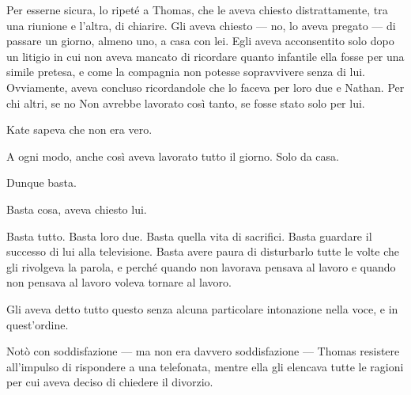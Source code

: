 \documentclass[a4paper,oneside,11pt]{memoir}
\begin{document}
Per esserne sicura, lo ripeté a Thomas, che le aveva chiesto distrattamente, tra una riunione e
l'altra, di chiarire. Gli aveva chiesto — no, lo aveva pregato — di passare un giorno, almeno uno, a
casa con lei. Egli aveva acconsentito solo dopo un litigio in cui non aveva mancato di ricordare
quanto infantile ella fosse per una simile pretesa, e come la compagnia non potesse sopravvivere
senza di lui. Ovviamente, aveva concluso ricordandole che lo faceva per loro due e Nathan. Per chi
altri, se no Non avrebbe lavorato così tanto, se fosse stato solo per lui.

Kate sapeva che non era vero.

A ogni modo, anche così aveva lavorato tutto il giorno. Solo da casa.

Dunque basta.

Basta cosa, aveva chiesto lui.

Basta tutto. Basta loro due. Basta quella vita di sacrifici. Basta guardare il successo di lui alla
televisione. Basta avere paura di disturbarlo tutte le volte che gli rivolgeva la parola, e perché
quando non lavorava pensava al lavoro e quando non pensava al lavoro voleva tornare al lavoro.

Gli aveva detto tutto questo senza alcuna particolare intonazione nella voce, e in quest'ordine.

Notò con soddisfazione — ma non era davvero soddisfazione — Thomas resistere all'impulso di
rispondere a una telefonata, mentre ella gli elencava tutte le ragioni per cui aveva deciso di
chiedere il divorzio.
\end{document}
